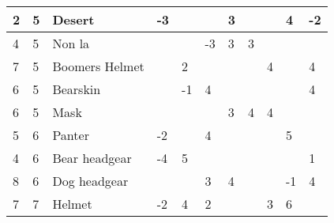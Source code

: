 \begin{table}[H]
{\begin{tabular}{|l|l|l|l|l|l|l|l|l|l|l|}
2 & 5 & Desert & -3 &  &  & 3 &  &  & 4 & -2 \\ \hline
4 & 5 & Non la &  &  & -3 & 3 & 3 &  &  &  \\ \hline
7 & 5 & Boomers Helmet &  & 2 &  &  &  & 4 &  & 4 \\ \hline
6 & 5 & Bearskin &  & -1 & 4 &  &  &  &  & 4 \\ \hline
6 & 5 & Mask &  &  &  & 3 & 4 & 4 &  &  \\ \hline
5 & 6 & Panter & -2 &  & 4 &  &  &  & 5 &  \\ \hline
4 & 6 & Bear headgear & -4 & 5 &  &  &  &  &  & 1 \\ \hline
8 & 6 & Dog headgear &  &  & 3 & 4 &  &  & -1 & 4 \\ \hline
7 & 7 & Helmet & -2 & 4 & 2 &  &  & 3 & 6 &  \\ \hline
\end{tabular}}
\end{table}

